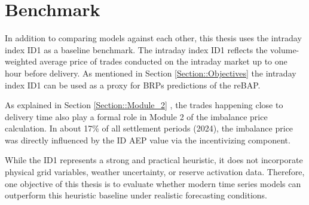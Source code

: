 \documentclass[class=scrbook, crop=false]{standalone}
\begin{document}
\section{Benchmark}
\label{Section:Benchmark}

In addition to comparing models against each other, this thesis uses the intraday index ID1 as a baseline benchmark. The intraday index ID1 reflects the volume-weighted average price of trades conducted on the intraday market up to one hour before delivery.
As mentioned in Section \ref{Section::Objectives} the intraday index ID1 can be used as a proxy for \gls{BRP}s predictions of the \gls{reBAP}.

As explained in Section \ref{Section::Module_2} , the trades happening close to delivery time also play a formal role in Module 2 of the imbalance price calculation. In about 17\% of all settlement periods (2024), the imbalance price was directly influenced by the ID AEP value via the incentivizing component.

While the ID1 represents a strong and practical heuristic\cite{narajewskiProbabilisticForecastingGerman2022}, it does not incorporate physical grid variables, weather uncertainty, or reserve activation data. Therefore, one objective of this thesis is to evaluate whether modern time series models can outperform this heuristic baseline under realistic forecasting conditions.




\end{document}
